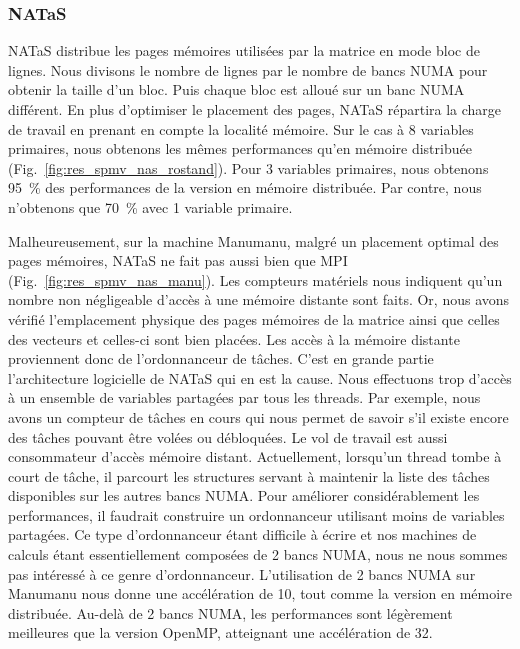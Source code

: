 \subsubsection{NATaS}
NATaS distribue les pages mémoires utilisées par la matrice en mode bloc de lignes.
%
Nous divisons le nombre de lignes par le nombre de bancs NUMA pour obtenir la taille d'un bloc.
%
Puis chaque bloc est alloué sur un banc NUMA différent.
%
En plus d'optimiser le placement des pages, NATaS répartira la charge de travail en prenant en compte la localité mémoire.
%
Sur le cas à 8 variables primaires, nous obtenons les mêmes performances qu'en mémoire distribuée (Fig.~\ref{fig:res_spmv_nas_rostand}).
%
Pour 3 variables primaires, nous obtenons 95~\% des performances de la version en mémoire distribuée.
%
Par contre, nous n'obtenons que 70~\% avec 1 variable primaire.


Malheureusement, sur la machine Manumanu, malgré un placement optimal des pages mémoires, NATaS ne fait pas aussi bien que MPI (Fig.~\ref{fig:res_spmv_nas_manu}).
%
Les compteurs matériels nous indiquent qu'un nombre non négligeable d'accès à une mémoire distante sont faits.
%
Or, nous avons vérifié l'emplacement physique des pages mémoires de la matrice ainsi que celles des vecteurs et celles-ci sont bien placées.
%
Les accès à la mémoire distante proviennent donc de l'ordonnanceur de tâches.
%
C'est en grande partie l'architecture logicielle de NATaS qui en est la cause.
%
Nous effectuons trop d'accès à un ensemble de variables partagées par tous les threads.
%
Par exemple, nous avons un compteur de tâches en cours qui nous permet de savoir s'il existe encore des tâches pouvant être volées ou débloquées.
%
Le vol de travail est aussi consommateur d'accès mémoire distant.
%
Actuellement, lorsqu'un thread tombe à court de tâche, il parcourt les structures servant à maintenir la liste des tâches disponibles sur les autres bancs NUMA.
%
Pour améliorer considérablement les performances, il faudrait construire un ordonnanceur utilisant moins de variables partagées.
%
Ce type d'ordonnanceur étant difficile à écrire et nos machines de calculs étant essentiellement composées de 2 bancs NUMA, nous ne nous sommes pas intéressé à ce genre d'ordonnanceur.
%
L'utilisation de 2 bancs NUMA sur Manumanu nous donne une accélération de 10, tout comme la version en mémoire distribuée.
%
Au-delà de 2 bancs NUMA, les performances sont légèrement meilleures que la version OpenMP, atteignant une accélération de 32.

